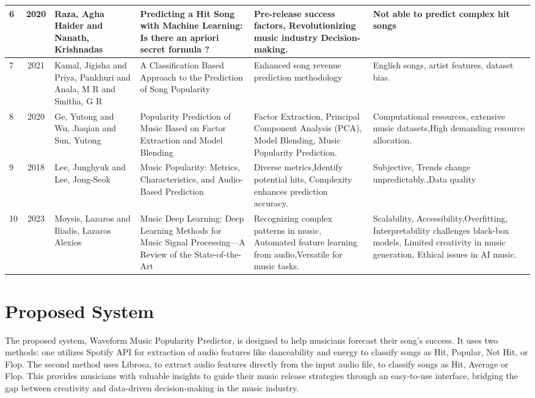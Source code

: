 \documentclass[11pt]{report}
\begin{document}
\begin{longtable}{|p{0.3cm}|c|p{2cm}|p{3.2cm}|p{3.2cm}|p{3.5cm}|}
6 & 2020 &Raza, Agha Haider and Nanath, Krishnadas & Predicting a Hit Song with Machine Learning: Is there an apriori secret formula ? & Pre-release success factors, Revolutionizing music industry Decision-making. & Not able to predict complex hit songs \\ \hline
7 & 2021 & Kamal, Jigisha and Priya, Pankhuri and Anala, M R and Smitha, G R & A Classification Based Approach to the Prediction of Song Popularity & Enhanced song revenue prediction methodology & English songs, artist features, dataset bias.  \\ \hline
8 & 2020 & Ge, Yutong and Wu, Jiaqian and Sun, Yutong & Popularity Prediction of Music Based on Factor Extraction and Model Blending & Factor Extraction, Principal Component Analysis (PCA), Model Blending, Music Popularity Prediction. & Computational resources, extensive music datasets,High demanding resource allocation. \\ \hline
9 & 2018 & Lee, Junghyuk and Lee, Jong-Seok & Music Popularity: Metrics, Characteristics, and Audio-Based Prediction &  Diverse metrics,Identify potential hits, Complexity enhances prediction accuracy. & Subjective, Trends change unpredictably.,Data quality \\ \hline
10 & 2023 & Moysis, Lazaros and Iliadis, Lazaros Alexios & Music Deep Learning: Deep Learning Methods for Music Signal Processing—A Review of the State-of-the-Art & Recognizing complex patterns in music, Automated feature learning from audio,Versatile for music tasks.&Scalability, Accessibility,Overfitting, Interpretability challenges black-box models, Limited creativity in music generation, Ethical issues in AI music. \\ \hline

\end{longtable}
 \clearpage

\section{Proposed System}
The proposed system, Waveform Music Popularity Predictor, is designed to help musicians forecast their song's success. It uses two methods: one utilizes Spotify API for extraction of audio features like danceability and energy to classify songs as Hit, Popular, Not Hit, or Flop. The second method uses Librosa, to extract audio features directly from the input audio file, to classify songs as Hit, Average or Flop. This provides musicians with valuable insights to guide their music release strategies through an easy-to-use interface, bridging the gap between creativity and data-driven decision-making in the music industry.
\end{document}
